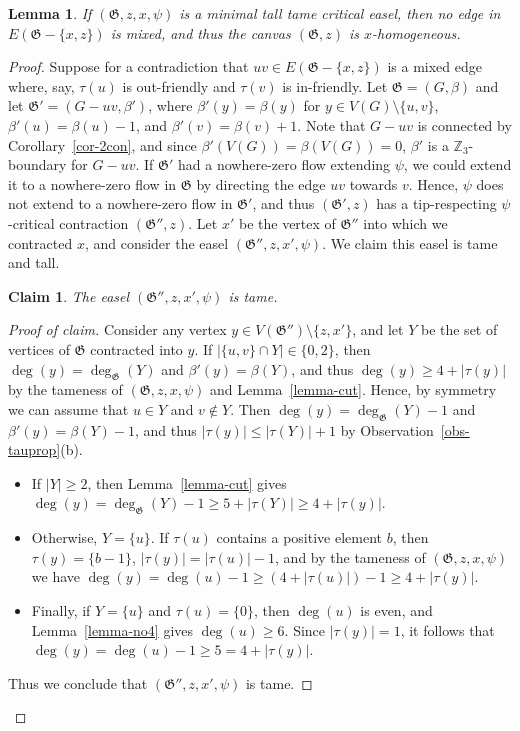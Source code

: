 \documentclass{article}
\newcommand{\Z}{\mathbb{Z}_3}
\newcommand\g{\mathfrak{G}}
\newtheorem{lemma}[theorem]{Lemma}
\newtheorem*{claim*}{Claim}
\newenvironment{subproof}{%
  \renewcommand{\qedsymbol}{$\blacksquare$}%
  \begin{proof}[Proof of claim]%
}{%
  \end{proof}%
}
\begin{document}
\begin{lemma}\label{lemma-norede}
If $(\g,z,x,\psi)$ is a minimal tall tame critical easel, then no edge in $E(\g-\{x,z\})$ is mixed, and thus the canvas $(\g,z)$ is $x$-homogeneous.
\end{lemma}
\begin{proof}
Suppose for a contradiction that $uv\in E(\g-\{x,z\})$ is a mixed edge where, say, $\tau(u)$ is out-friendly and $\tau(v)$ is in-friendly.  Let $\g=(G,\beta)$ and let $\g'=(G-uv,\beta')$, where $\beta'(y)=\beta(y)$ for $y\in V(G)\setminus\{u,v\}$, $\beta'(u)=\beta(u)-1$,
and $\beta'(v)=\beta(v)+1$.  Note that $G-uv$ is connected by Corollary~\ref{cor-2con}, and since $\beta'(V(G))=\beta(V(G))=0$,
$\beta'$ is a $\Z$-boundary for $G-uv$.  If $\g'$ had a nowhere-zero flow extending $\psi$, we could extend it to a nowhere-zero flow in $\g$
by directing the edge $uv$ towards $v$.  Hence, $\psi$ does not extend to a nowhere-zero flow in $\g'$, and thus $(\g',z)$ has a tip-respecting
$\psi$-critical contraction $(\g'',z)$.  Let $x'$ be the vertex of $\g''$ into which we contracted $x$, and consider the easel $(\g'',z,x',\psi)$. We claim this easel is tame and tall.

\begin{claim*}
The easel $(\g'',z,x',\psi)$ is tame.
\end{claim*}

\begin{subproof}
 Consider any vertex $y\in V(\g'')\setminus \{z,x'\}$, and let $Y$ be the set of vertices of $\g$ contracted into $y$.  If $|\{u,v\}\cap Y|\in\{0,2\}$, then $\deg(y)=\deg_{\g}(Y)$ and $\beta'(y)=\beta(Y)$, and thus $\deg(y)\ge 4+|\tau(y)|$
by the tameness of $(\g,z,x,\psi)$ and Lemma~\ref{lemma-cut}.  Hence, by symmetry we can assume that $u\in Y$ and $v\not\in Y$.
Then $\deg(y)=\deg_{\g}(Y)-1$ and $\beta'(y)=\beta(Y)-1$, and thus $|\tau(y)|\le |\tau(Y)|+1$ by Observation~\ref{obs-tauprop}(b).
\begin{itemize}
\item If $|Y|\ge 2$, then Lemma~\ref{lemma-cut} gives $\deg(y)=\deg_{\g}(Y)-1\ge 5+|\tau(Y)|\ge 4+|\tau(y)|$.
\item Otherwise, $Y=\{u\}$.  If $\tau(u)$ contains a positive element $b$, then $\tau(y)=\{b-1\}$, $|\tau(y)|=|\tau(u)|-1$,
and by the tameness of  $(\g,z,x,\psi)$ we have $\deg(y)=\deg(u)-1\ge (4+|\tau(u)|)-1\ge 4+|\tau(y)|$.
\item Finally, if $Y=\{u\}$ and $\tau(u)=\{0\}$, then $\deg(u)$ is even, and Lemma~\ref{lemma-no4} gives $\deg(u)\ge 6$.
Since $|\tau(y)|=1$, it follows that $\deg(y)=\deg(u)-1\ge 5=4+|\tau(y)|$.
\end{itemize}
Thus we conclude that $(\g'',z,x',\psi)$ is tame.
\end{subproof}


\end{proof}
\end{document}
